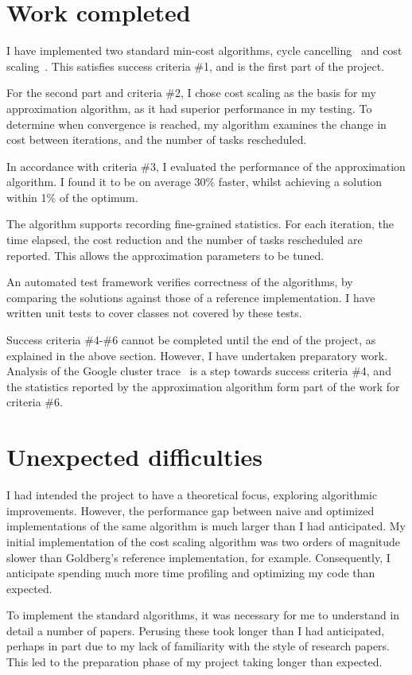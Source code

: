 \section{Work completed}

I have implemented two standard min-cost algorithms, cycle cancelling~\cite{Klein:1967} and cost scaling~\cite{Goldberg:1987}. This satisfies success criteria \#1, and is the first part of the project.

For the second part and criteria \#2, I chose cost scaling as the basis for my approximation algorithm, as it had superior performance in my testing. To determine when convergence is reached, my algorithm examines the change in cost between iterations, and the number of tasks rescheduled.

In accordance with criteria \#3, I evaluated the performance of the approximation algorithm. I found it to be on average 30\% faster, whilst achieving a solution within 1\% of the optimum. 

The algorithm supports recording fine-grained statistics. For each iteration, the time elapsed, the cost reduction and the number of tasks rescheduled are reported. This allows the approximation parameters to be tuned.

An automated test framework verifies correctness of the algorithms, by comparing the solutions against those of a reference implementation. I have written unit tests to cover classes not covered by these tests.

Success criteria \#4-\#6 cannot be completed until the end of the project, as explained in the above section. However, I have undertaken preparatory work. Analysis of the Google cluster trace~\cite{clusterdata:Wilkes2011} is a step towards success criteria \#4, and the statistics reported by the approximation algorithm form part of the work for criteria \#6.

\section{Unexpected difficulties}

I had intended the project to have a theoretical focus, exploring algorithmic improvements. However, the performance gap between naive and optimized implementations of the same algorithm is much larger than I had anticipated. My initial implementation of the cost scaling algorithm was two orders of magnitude slower than Goldberg's reference implementation, for example. Consequently, I anticipate spending much more time profiling and optimizing my code than expected.

To implement the standard algorithms, it was necessary for me to understand in detail a number of papers. Perusing these took longer than I had anticipated, perhaps in part due to my lack of familiarity with the style of research papers. This led to the preparation phase of my project taking longer than expected.
